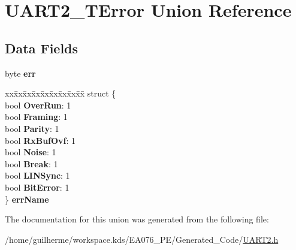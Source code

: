 \hypertarget{union_u_a_r_t2___t_error}{}\section{U\+A\+R\+T2\+\_\+\+T\+Error Union Reference}
\label{union_u_a_r_t2___t_error}
\subsection*{Data Fields}
\begin{DoxyCompactItemize}
\item 
\mbox{\label{union_u_a_r_t2___t_error_aa3f961e4ff3d98b18469fca648a44da9}} 
byte {\bfseries err}
\item 
\mbox{\label{union_u_a_r_t2___t_error_ac804e341663b76243ff4539b24266994}} 
\begin{tabbing}
xx\=xx\=xx\=xx\=xx\=xx\=xx\=xx\=xx\=\kill
struct \{\\
\>bool {\bfseries OverRun}: 1\\
\>bool {\bfseries Framing}: 1\\
\>bool {\bfseries Parity}: 1\\
\>bool {\bfseries RxBufOvf}: 1\\
\>bool {\bfseries Noise}: 1\\
\>bool {\bfseries Break}: 1\\
\>bool {\bfseries LINSync}: 1\\
\>bool {\bfseries BitError}: 1\\
\} {\bfseries errName}\\

\end{tabbing}\end{DoxyCompactItemize}


The documentation for this union was generated from the following file\+:\begin{DoxyCompactItemize}
\item 
/home/guilherme/workspace.\+kds/\+E\+A076\+\_\+\+P\+E/\+Generated\+\_\+\+Code/\hyperlink{_u_a_r_t2_8h}{U\+A\+R\+T2.\+h}\end{DoxyCompactItemize}
